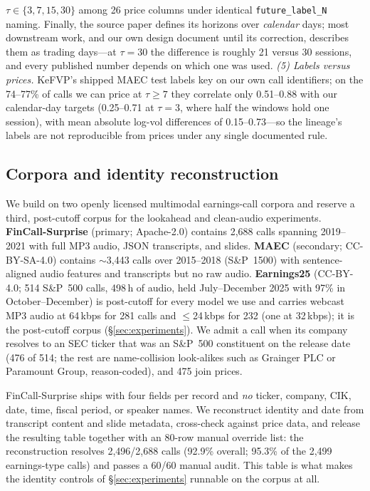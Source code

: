 $\tau\in\{3,7,15,30\}$ among 26 price columns under identical
\texttt{future\_label\_N} naming. Finally, the source paper defines its horizons
over \emph{calendar} days; most downstream work, and our own design document until
its correction, describes them as trading days---at $\tau{=}30$ the difference is
roughly 21 versus 30 sessions, and every published number depends on which one was
used. \emph{(5) Labels versus prices.} KeFVP's shipped MAEC test labels key on our
own call identifiers; on the 74--77\% of calls we can price at $\tau\ge7$ they
correlate only 0.51--0.88 with our calendar-day targets (0.25--0.71 at $\tau{=}3$,
where half the windows hold one session), with mean absolute log-vol differences
of 0.15--0.73---so the lineage's labels are not reproducible from prices under
any single documented rule.



\subsection{Corpora and identity reconstruction}
\label{sec:corpora}
We build on two openly licensed multimodal earnings-call corpora and reserve a
third, post-cutoff corpus for the lookahead and clean-audio experiments.
\textbf{FinCall-Surprise} \citep{fincall2025} (primary; Apache-2.0) contains 2{,}688
calls spanning 2019--2021 with full MP3 audio, JSON transcripts, and slides.
\textbf{MAEC} \citep{li2020maec} (secondary; CC-BY-SA-4.0) contains $\sim$3{,}443
calls over 2015--2018 (S\&P~1500) with sentence-aligned audio features and
transcripts but no raw audio. \textbf{Earnings25} \citep{jiang2026earnings25} (CC-BY-4.0; 514 S\&P~500 calls, 498\,h of audio, held July--December 2025 with
97\% in October--December) is post-cutoff for every model we use and carries
webcast MP3 audio at 64\,kbps for 281 calls and $\le$24\,kbps for 232 (one at
32\,kbps); it is
the post-cutoff corpus (\S\ref{sec:experiments}). We admit a call when its company
resolves to an SEC ticker that was an S\&P~500 constituent on the release date
(476 of 514; the rest are name-collision look-alikes such as Grainger PLC or
Paramount Group, reason-coded), and 475 join prices.

FinCall-Surprise ships with four fields per record and \emph{no} ticker, company,
CIK, date, time, fiscal period, or speaker names. We reconstruct identity and date
from transcript content and slide metadata, cross-check against price data, and
release the resulting table together with an 80-row manual override list: the
reconstruction resolves 2{,}496/2{,}688 calls (92.9\% overall; 95.3\% of the 2{,}499
earnings-type calls) and passes a 60/60 manual audit. This table is what makes the
identity controls of \S\ref{sec:experiments} runnable on the corpus at all.

